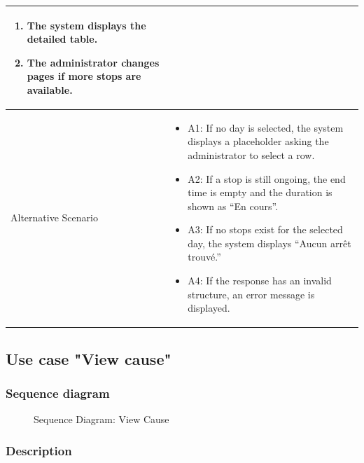 {\begin{longtable}{|p{}|p{}|}
\begin{enumerate}
\item The system displays the detailed table.
\item The administrator changes pages if more stops are available.
\end{enumerate} \\ \hline
Alternative Scenario &
\begin{itemize}
\item A1: If no day is selected, the system displays a placeholder asking the administrator to select a row.
\item A2: If a stop is still ongoing, the end time is empty and the duration is shown as ``En cours''.
\item A3: If no stops exist for the selected day, the system displays ``Aucun arrêt trouvé.''
\item A4: If the response has an invalid structure, an error message is displayed.
\end{itemize} \\ \hline
\end{longtable}
}

\subsection{Use case "View cause"}

\subsubsection{Sequence diagram}

\vspace{-3pt}
\begin{figure}[H]
\centering
{}
\caption{Sequence Diagram: View Cause}
\label{fig:chapter2-view-cause}
\end{figure}

\subsubsection{Description}

